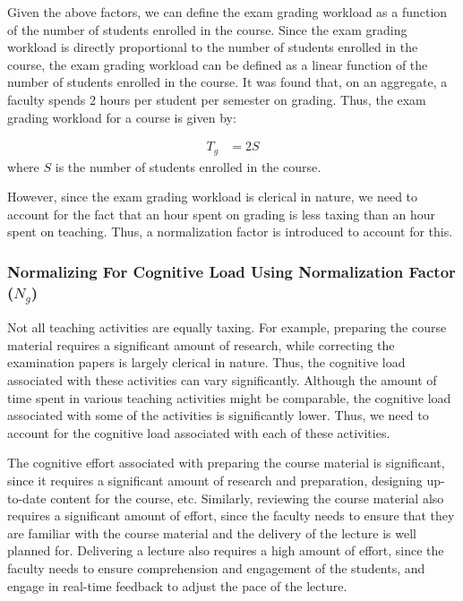 Given the above factors, we can define the exam grading workload as a function of the number of students enrolled in the course. Since the exam grading workload is directly proportional to the number of students enrolled in the course, the exam grading workload can be defined as a linear function of the number of students enrolled in the course. It was found that, on an aggregate, a faculty spends 2 hours per student per semester on grading. Thus, the exam grading workload for a course is given by:

\begin{equation*}
  \begin{aligned}
    T_g & = 2 S
  \end{aligned}
\end{equation*}
where \(S\) is the number of students enrolled in the course.

However, since the exam grading workload is clerical in nature, we need to account for the fact that an hour spent on grading is less taxing than an hour spent on teaching. Thus, a normalization factor is introduced to account for this.

\subsubsection{Normalizing For Cognitive Load Using Normalization Factor (\(N_g\))}

Not all teaching activities are equally taxing. For example, preparing the course material requires a significant amount of research, while correcting the examination papers is largely clerical in nature. Thus, the cognitive load associated with these activities can vary significantly. Although the amount of time spent in various teaching activities might be comparable, the cognitive load associated with some of the activities is significantly lower. Thus, we need to account for the cognitive load associated with each of these activities.

The cognitive effort associated with preparing the course material is significant, since it requires a significant amount of research and preparation, designing up-to-date content for the course, etc. Similarly, reviewing the course material also requires a significant amount of effort, since the faculty needs to ensure that they are familiar with the course material and the delivery of the lecture is well planned for. Delivering a lecture also requires a high amount of effort, since the faculty needs to ensure comprehension and engagement of the students, and engage in real-time feedback to adjust the pace of the lecture.

